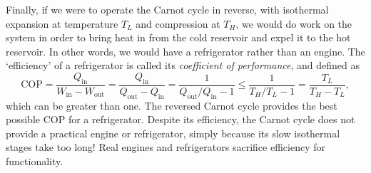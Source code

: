 Finally, if we were to operate the Carnot cycle in reverse, with isothermal expansion at temperature $T_L$ and compression at $T_H$, we would do work on the system in order to bring heat in from the cold reservoir and expel it to the hot reservoir.
In other words, we would have a refrigerator rather than an engine.
The `efficiency' of a refrigerator is called its \textit{coefficient of performance}, and defined as
\begin{equation*}
  \mathrm{COP} = \frac{Q_{\text{in}}}{W_{\text{in}} - W_{\text{out}}} = \frac{Q_{\text{in}}}{Q_{\text{out}} - Q_{\text{in}}} = \frac{1}{Q_{\text{out}} / Q_{\text{in}} - 1} \leq \frac{1}{T_H / T_L - 1} = \frac{T_L}{T_H - T_L},
\end{equation*}
which can be greater than one.
The reversed Carnot cycle provides the best possible $\mathrm{COP}$ for a refrigerator.
Despite its efficiency, the Carnot cycle does not provide a practical engine or refrigerator, simply because its slow isothermal stages take too long!
Real engines and refrigerators sacrifice efficiency for functionality.
